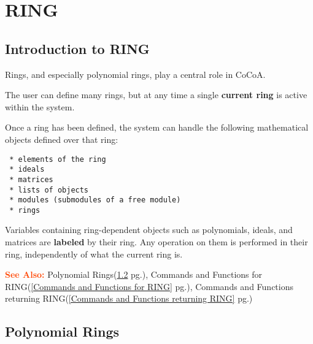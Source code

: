 \documentclass[a4paper]{mybook}
\newcommand\SeeAlso{\par\textcolor{OrangeRed}{\textbf{\large See Also: }}}
\begin{document}
\chapter{RING}
\label{RING}

      

\section{Introduction to RING}
\label{Introduction to RING}

        
Rings, and especially polynomial rings, play a central role in CoCoA.
\par 
The user can define many rings, but at any time a single \textbf{current ring}
is active within the system.
\par 
Once a ring has been defined, the system can handle the following
mathematical objects defined over that ring:
\begin{verbatim}
 * elements of the ring
 * ideals
 * matrices
 * lists of objects
 * modules (submodules of a free module)
 * rings
\end{verbatim}
Variables containing ring-dependent objects such as polynomials,
ideals, and matrices are \textbf{labeled} by their ring.
Any operation on them is performed in their ring, independently of
what the current ring is.

\SeeAlso %
  Polynomial Rings(\ref{Polynomial Rings} pg.\pageref{Polynomial Rings}), 
    Commands and Functions for RING(\ref{Commands and Functions for RING} pg.\pageref{Commands and Functions for RING}), 
    Commands and Functions returning RING(\ref{Commands and Functions returning RING} pg.\pageref{Commands and Functions returning RING})

\section{Polynomial Rings}
\label{Polynomial Rings}
\end{document}

